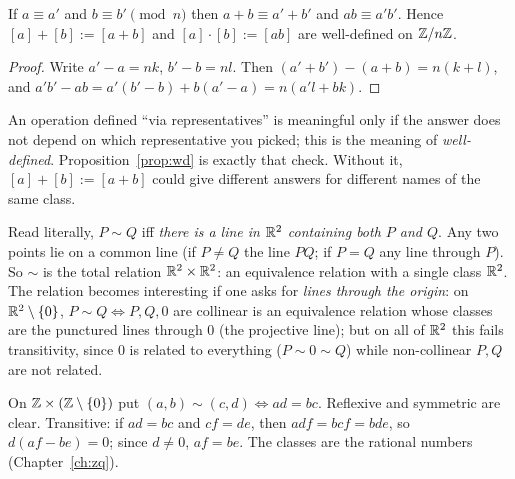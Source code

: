 \begin{proposition}\label{prop:wd}
	If $a\equiv a'$ and $b\equiv b'\pmod n$ then $a+b\equiv a'+b'$ and $ab\equiv a'b'$. Hence $[a]+[b]:=[a+b]$ and $[a]\cdot[b]:=[ab]$ are well-defined on $\mathbb{Z}/n\mathbb{Z}$.
\end{proposition}
\begin{proof}
	Write $a'-a=nk$, $b'-b=nl$. Then $(a'+b')-(a+b)=n(k+l)$, and $a'b'-ab=a'(b'-b)+b(a'-a)=n(a'l+bk)$.
\end{proof}
\begin{intuition}
	An operation defined ``via representatives'' is meaningful only if the answer does not depend on which representative you picked; this is the meaning of \emph{well-defined}. Proposition~\ref{prop:wd} is exactly that check. Without it, $[a]+[b]:=[a+b]$ could give different answers for different names of the same class.
\end{intuition}

\begin{example}\label{ex:sameline}
	Read literally, $P\sim Q$ iff \emph{there is a line in $\mathbb{R}^2$ containing both $P$ and $Q$}. Any two points lie on a common line (if $P\ne Q$ the line $PQ$; if $P=Q$ any line through $P$). So $\sim$ is the total relation $\mathbb{R}^2\times\mathbb{R}^2$: an equivalence relation with a single class $\mathbb{R}^2$. The relation becomes interesting if one asks for \emph{lines through the origin}: on $\mathbb{R}^2\setminus\{0\}$, $P\sim Q\iff P,Q,0$ are collinear is an equivalence relation whose classes are the punctured lines through $0$ (the projective line); but on all of $\mathbb{R}^2$ this fails transitivity, since $0$ is related to everything ($P\sim0\sim Q$) while non-collinear $P,Q$ are not related.
\end{example}

\begin{example}[Fractions]\label{ex:fractions}
	On $\mathbb{Z}\times(\mathbb{Z}\setminus\{0\})$ put $(a,b)\sim(c,d)\iff ad=bc$. Reflexive and symmetric are clear. Transitive: if $ad=bc$ and $cf=de$, then $adf=bcf=bde$, so $d(af-be)=0$; since $d\ne0$, $af=be$. The classes are the rational numbers (Chapter~\ref{ch:zq}).
\end{example}